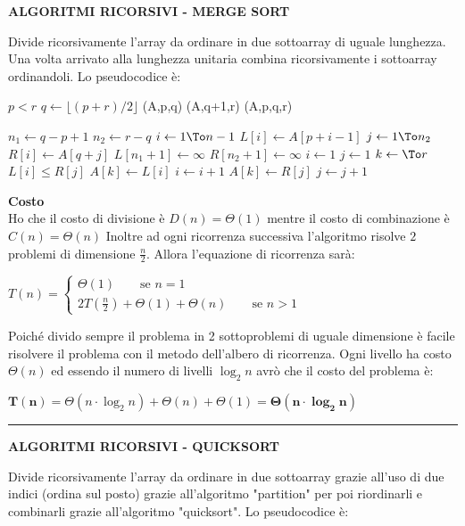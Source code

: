 \documentclass[9pt]{extarticle}
\newenvironment{formulario}
{
\setlength{\columnsep}{3em}
\twocolumn
\lstset{tabsize=3}
\begin{spacing}{1}
\begin{flushleft}
}{
\end{flushleft}
\end{spacing}
}
\newenvironment{tcenter}{
  \par
  \centering
  \setlength{\parskip}{0pt} %
  \noindent
}{
  \par
}
\newenvironment{code}[1]
{
\begin{codebox}
\Procname{$#1$}
}{
\end{codebox}
}
\newcommand{\myRule}{\rule{250pt}{0.1pt}}
\newcommand{\bo}[1]{\textbf{#1}}
\newcommand{\la}{\leftarrow}
\newcommand{\floor}[1]{\lfloor #1 \rfloor}
\newcommand{\FOR}[1]{\For $#1$ \Do}
\newcommand{\IF}[1]{\If $#1$ \Then}
\begin{document}
\begin{formulario}
		\begin{tcenter}
\bo{ALGORITMI RICORSIVI - MERGE SORT}
		\end{tcenter}
Divide ricorsivamente l'array da ordinare in due sottoarray di uguale lunghezza. Una volta arrivato alla lunghezza unitaria combina ricorsivamente i sottoarray ordinandoli. Lo pseudocodice è:
		\begin{code}{MergeSort(A,p,r)}
\li \IF{p<r} 
	\li $q\la \floor{(p+r)/2}$ 
	\li {}(A,p,q)
	\li {}(A,q+1,r)
	\li {}(A,p,q,r)
\End
		\end{code}		
		\begin{code}{Merge(A,p,q,r)}
\li $n_1 \la q-p+1$
\li $n_2 \la r-q$
\li \FOR{i \la 1 \To n-1} 
	\li $L[i] \la A[p+i-1]$
\End
\li \FOR{j \la 1 \To n_2} 
	\li $R[i] \la A[q+j]$
\End
\li $L[n_1+1]\la \infty$
\li $R[n_2+1]\la \infty$
\li $i \la 1$
\li $j \la 1$
\li \FOR{k \la \To r}
	\li \IF{L[i]\leq R[j]}
		\li $A[k]\la L[i]$
		\li $i \la i+1$
	\Else
		\li $A[k]\la R[j]$
		\li $j \la j+1$
	\End
\End
		\end{code}		
\bo{Costo}\\
Ho che il costo di divisione è $D(n)=\Theta(1)$ mentre il costo di combinazione è $C(n)=\Theta(n)$ Inoltre ad ogni ricorrenza successiva l'algoritmo risolve $2$ problemi di dimensione $\frac{n}{2}$. Allora l'equazione di ricorrenza sarà: 
		\begin{tcenter}
$
T(n)=
		\begin{cases}
\Theta(1) \qquad\text{se }n=1 \\
2T(\frac{n}{2})+\Theta(1)+\Theta(n) \qquad\text{se }n>1
		\end{cases}
$
		\end{tcenter}
Poiché divido sempre il problema in 2 sottoproblemi di uguale dimensione è facile risolvere il problema con il metodo dell'albero di ricorrenza. Ogni livello ha costo $\Theta(n)$ ed essendo il numero di livelli $\log_2 n$ avrò che il costo del problema è:
		\begin{tcenter} 
$\mathbf{T(n)=}\Theta(n\cdot \log_2 n) + \Theta(n) + \Theta(1)=\mathbf{\Theta(n\cdot \log_2 n)}$
		\end{tcenter}
\myRule

		\begin{tcenter}
\bf{ALGORITMI RICORSIVI - QUICKSORT}
		\end{tcenter}
Divide ricorsivamente l'array da ordinare in due sottoarray grazie all'uso di due indici (ordina sul posto) grazie all'algoritmo "partition" per poi riordinarli e combinarli grazie all'algoritmo "quicksort". Lo pseudocodice è:


\end{formulario}
\end{document}
